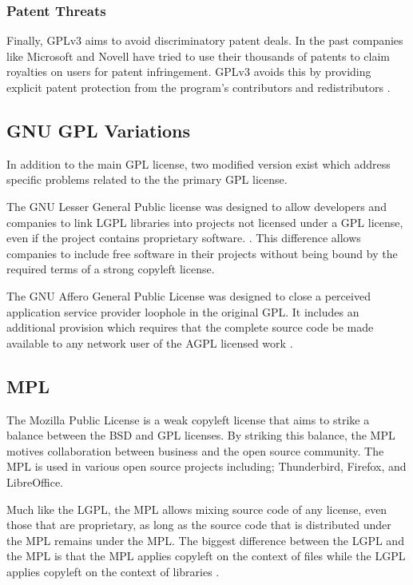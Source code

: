 \documentclass[12pt,letterpaper]{article}
\begin{document}
\subsubsection{Patent Threats}

Finally, GPLv3 aims to avoid discriminatory patent deals. In the past companies like Microsoft and Novell have tried to use their thousands of patents to claim royalties on users for patent infringement. GPLv3 avoids this by providing explicit patent protection from the program's contributors and redistributors \cite{gpl3}.

\newpage

\subsection{GNU GPL Variations}

In addition to the main GPL license, two modified version exist which address specific problems related to the the primary GPL license.

The GNU Lesser General Public license was designed to allow developers and companies to link LGPL libraries into projects not licensed under a GPL license, even if the project contains proprietary software. \cite{lgpl}. This difference allows companies to include free software in their projects without being bound by the required terms of a strong copyleft license.

The GNU Affero General Public License was designed to close a perceived application service provider loophole in the original GPL. It includes an additional provision which requires that the complete source code be made available to any network user of the AGPL licensed work \cite{agpl}.

\subsection{MPL}

The Mozilla Public License is a weak copyleft license that aims to strike a balance between the BSD and GPL licenses. By striking this balance, the MPL motives collaboration between business and the open source community. The MPL is used in various open source projects including; Thunderbird, Firefox, and LibreOffice.

Much like the LGPL, the MPL allows mixing source code of any license, even those that are proprietary, as long as the source code that is distributed under the MPL remains under the MPL. The biggest difference between the LGPL and the MPL is that the MPL applies copyleft on the context of files while the LGPL applies copyleft on the context of libraries \cite{mpl}.
\end{document}
